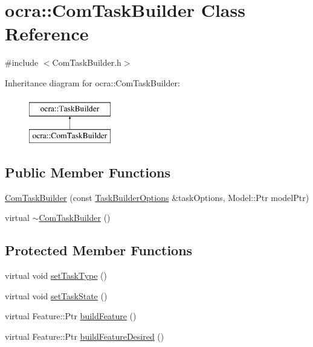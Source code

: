 \hypertarget{classocra_1_1ComTaskBuilder}{}\section{ocra\+:\+:Com\+Task\+Builder Class Reference}
\label{classocra_1_1ComTaskBuilder}


{\ttfamily \#include $<$Com\+Task\+Builder.\+h$>$}

Inheritance diagram for ocra\+:\+:Com\+Task\+Builder\+:\begin{figure}[H]
\begin{center}
\leavevmode
\includegraphics[height=2.000000cm]{d1/d14/classocra_1_1ComTaskBuilder}
\end{center}
\end{figure}
\subsection*{Public Member Functions}
\begin{DoxyCompactItemize}
\item 
\hyperlink{classocra_1_1ComTaskBuilder_aa3cffa7682c1122e7e5bfa533a66f9bc}{Com\+Task\+Builder} (const \hyperlink{classocra_1_1TaskBuilderOptions}{Task\+Builder\+Options} \&task\+Options, Model\+::\+Ptr model\+Ptr)
\item 
virtual \hyperlink{classocra_1_1ComTaskBuilder_a17a4747e20d9e37f734a9f27820d068d}{$\sim$\+Com\+Task\+Builder} ()
\end{DoxyCompactItemize}
\subsection*{Protected Member Functions}
\begin{DoxyCompactItemize}
\item 
virtual void \hyperlink{classocra_1_1ComTaskBuilder_af9cfac995156297324ccbee1900f891c}{set\+Task\+Type} ()
\item 
virtual void \hyperlink{classocra_1_1ComTaskBuilder_ab514d4644f7dfeec3ae84a5b0b8bbc34}{set\+Task\+State} ()
\item 
virtual Feature\+::\+Ptr \hyperlink{classocra_1_1ComTaskBuilder_aa4e0d21159da91788a1d2806ddca84da}{build\+Feature} ()
\item 
virtual Feature\+::\+Ptr \hyperlink{classocra_1_1ComTaskBuilder_abdd4c74539a37ff4c719c0ac78812bf4}{build\+Feature\+Desired} ()
\end{DoxyCompactItemize}

